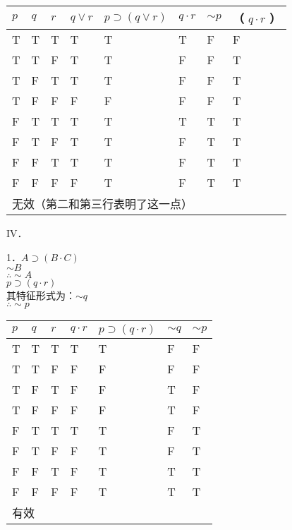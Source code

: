 \begin{center}
\begin{tabular}{|l|l|l|l|l|l|l|l|}
\hline
$p$ & $q$ & $r$ & $q \vee r$ & $p \supset(q \vee r)$ & $q \cdot r$ & $\sim p$ & （ $q \cdot r$ ） \\
\hline
T & T & T & T & T & T & F & F \\
\hline
T & T & F & T & T & F & F & T \\
\hline
T & F & T & T & T & F & F & T \\
\hline
T & F & F & F & F & F & F & T \\
\hline
F & T & T & T & T & T & T & T \\
\hline
F & T & F & T & T & F & T & T \\
\hline
F & F & T & T & T & F & T & T \\
\hline
F & F & F & F & T & F & T & T \\
\hline
\multicolumn{8}{|l|}{无效（第二和第三行表明了这一点）} \\
\hline
\end{tabular}
\end{center}

IV．

1．$A \supset(B \cdot C)$\\
$\sim B$\\
$\therefore \sim A$\\
$p \supset(q \cdot r)$\\
其特征形式为：$\sim q$\\
$\therefore \sim p$

\begin{center}
\begin{tabular}{|l|l|l|l|l|l|l|}
\hline
$p$ & $q$ & $r$ & $q \cdot r$ & $p \supset(q \cdot r)$ & $\sim q$ & $\sim p$ \\
\hline
T & T & T & T & T & F & F \\
\hline
T & T & F & F & F & F & F \\
\hline
T & F & T & F & F & T & F \\
\hline
T & F & F & F & F & T & F \\
\hline
F & T & T & T & T & F & T \\
\hline
F & T & F & F & T & F & T \\
\hline
F & F & T & F & T & T & T \\
\hline
F & F & F & F & T & T & T \\
\hline
\multicolumn{7}{|l|}{有效} \\
\hline
\end{tabular}
\end{center}


